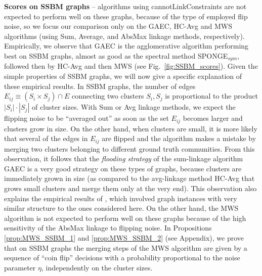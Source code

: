 \textbf{Scores on SSBM graphs}  -- 
\algname{} algorithms using cannotLinkConstraints are not expected to perform well on these graphs, because of the type of employed flip noise, so we focus our comparison only on the GAEC, HC-Avg and MWS algorithms (using Sum, Average, and AbsMax linkage methods, respectively).
Empirically, we observe that GAEC is the agglomerative algorithm performing best on SSBM graphs, almost as good as the spectral method SPONGE$_{sym}$, followed then by HC-Avg and then MWS (see Fig.~\ref{fig:SSBM_scores}). Given the simple properties of SSBM graphs, we will now give a specific explanation of these empirical results. 
In SSBM graphs, the number of edges $E_{ij}\equiv(S_i\times S_j)\cap E$ connecting two clusters $S_i,S_j$ is  proportional to the product $|S_i|\cdot|S_j|$ of cluster sizes. With Sum or Avg linkage methods, we expect the flipping noise to be ``averaged out'' as soon as the set $E_{ij}$ becomes larger and clusters grow in size. On the other hand, when clusters are small, it is more likely that several of the edges in $E_{ij}$ are flipped and the algorithm makes a mistake by merging two clusters belonging to different ground truth communities. From this observation, it follows that the \emph{flooding strategy} of the sum-linkage algorithm GAEC is a very good strategy on these types of graphs, because clusters are immediately grown in size (as compared to the avg-linkage method HC-Avg that grows small clusters and merge them only at the very end). This observation also explains the empirical results of \cite{chehreghani2020hierarchical}, which involved graph instances with very similar structure to the ones considered here. On the other hand, the MWS algorithm is not expected to perform well on these graphs because of the high sensitivity of the AbsMax linkage to flipping noise. In Propositions \ref{prop:MWS_SSBM_1} and \ref{prop:MWS_SSBM_2} (see Appendix), we prove that on SSBM graphs the merging steps of the MWS algorithm are given by a sequence of ``coin flip'' decisions with a probability proportional to the noise parameter $\eta$, independently on the cluster sizes.
 

